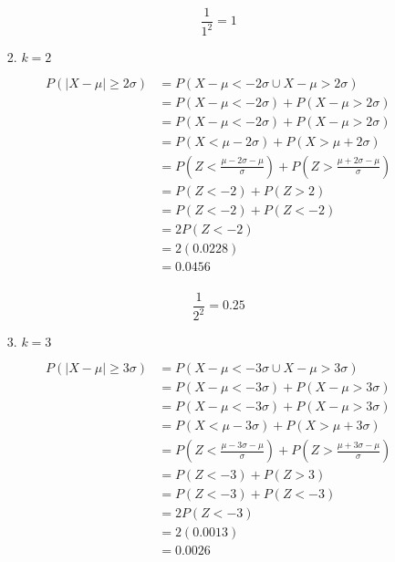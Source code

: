 \documentclass[12pt,letterpaper]{article}
\begin{document}
\begin{enumerate}
\begin{enumerate}
\begin{enumerate}
              \[
                \frac{1}{1^2} = 1
              \]

            \item $k = 2$

              \begin{align*}
                P(|X - \mu| \ge 2 \sigma) &= P(X - \mu < -2 \sigma \cup X - \mu > 2 \sigma) \\
                &= P(X - \mu < -2 \sigma) + P(X - \mu > 2 \sigma) \\
                &= P(X - \mu < -2 \sigma) + P(X - \mu > 2 \sigma) \\
                &= P(X < \mu - 2 \sigma) + P(X > \mu + 2 \sigma) \\
                &= P\left(Z < \frac{\mu - 2 \sigma - \mu}{\sigma}\right) + P\left(Z > \frac{\mu + 2 \sigma - \mu}{\sigma}\right) \\
                &= P(Z < -2) + P(Z > 2) \\
                &= P(Z < -2) + P(Z < -2) \\
                &= 2P(Z < -2) \\
                &= 2(0.0228) \\
                &= 0.0456 \\
              \end{align*}

              \[
                \frac{1}{2^2} = 0.25
              \]

            \item $k = 3$

              \begin{align*}
                P(|X - \mu| \ge 3 \sigma) &= P(X - \mu < -3 \sigma \cup X - \mu > 3 \sigma) \\
                &= P(X - \mu < -3 \sigma) + P(X - \mu > 3 \sigma) \\
                &= P(X - \mu < -3 \sigma) + P(X - \mu > 3 \sigma) \\
                &= P(X < \mu - 3 \sigma) + P(X > \mu + 3 \sigma) \\
                &= P\left(Z < \frac{\mu - 3 \sigma - \mu}{\sigma}\right) + P\left(Z > \frac{\mu + 3 \sigma - \mu}{\sigma}\right) \\
                &= P(Z < -3) + P(Z > 3) \\
                &= P(Z < -3) + P(Z < -3) \\
                &= 2P(Z < -3) \\
                &= 2(0.0013) \\
                &= 0.0026 \\
              \end{align*}


\end{enumerate}
\end{enumerate}
\end{enumerate}
\end{document}
